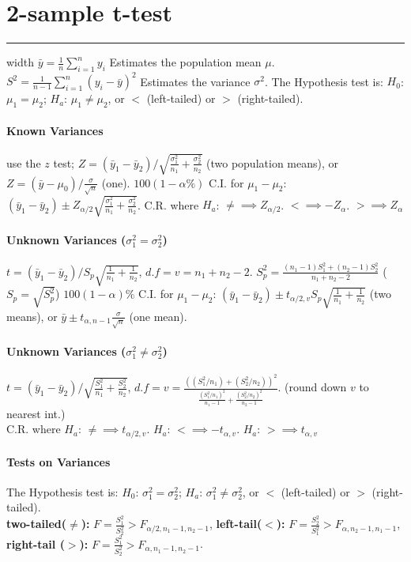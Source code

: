 \documentclass[10pt]{article}
\begin{document}
\section*{2-sample t-test}
\hrule width \textwidth
\vspace{6pt}
$\bar{y} = \frac{1}{n} \sum_{i=1}^{n} y_i$ Estimates the population mean $\mu$. $S^2 = \frac{1}{n-1}\sum_{i=1}^{n} (y_i - \bar{y})^2$ Estimates the variance $\sigma^2$. 
The Hypothesis test is:     $H_0$: $\mu_1 = \mu_2$; $H_a$: $\mu_1 \neq \mu_2$, or $<$ (left-tailed) or $>$ (right-tailed).
\paragraph{Known Variances} use the $z$ test; $Z = (\bar{y}_1 - \bar{y}_2) / \sqrt{\frac{\sigma_1^2}{n_1} + \frac{\sigma_2^2}{n_2}}$ (two population means), or $Z = (\bar{y} - \mu_0) / \frac{\sigma}{\sqrt{n}}$ (one). 
$100(1-\alpha\%)$ C.I. for $\mu_1 - \mu_2$: $(\bar{y}_1 - \bar{y}_2) \pm Z_{\alpha/2}\sqrt{\frac{\sigma_1^2}{n_1} + \frac{\sigma_2^2}{n_2}}$. 
C.R. where $H_a$: $\neq \implies Z_{\alpha / 2}$. $< \implies -Z_{\alpha}$. $> \implies Z_{\alpha}$  
\paragraph{Unknown Variances ($\sigma_1^2 = \sigma_2^2$)} $t = (\bar{y}_1 - \bar{y}_2) / S_p \sqrt{\frac{1}{n_1} + \frac{1}{n_2}}$, $d.f = v = n_1 + n_2 - 2$. $S_p^2 = \frac{(n_1 - 1)S_1^2 + (n_2 - 1)S_2^2}{n_1 + n_2 - 2}$ ($S_p = \sqrt{S_p^2}$)
$100(1-\alpha)\%$ C.I. for $\mu_1 - \mu_2$: $(\bar{y}_1 - \bar{y}_2) \pm t_{\alpha/2, v}S_p \sqrt{\frac{1}{n_1} + \frac{1}{n_2}}$ (two means), or $\bar{y} \pm t_{\alpha,n-1}\frac{\sigma}{\sqrt{n}}$ (one mean).
\paragraph{Unknown Variances ($\sigma_1^2 \neq \sigma_2^2$)} $t = (\bar{y}_1 - \bar{y}_2) / \sqrt{\frac{S_1^2}{n_1} + \frac{S_2^2}{n_2}}$, $d.f = v = \frac{((S_1^2/n_1) + (S_2^2/n_2))^2}{\frac{(S_1^2/n_1)^2}{n_1 - 1} + \frac{(S_2^2/n_2)^2}{n_2 - 1}}$. (round down $v$ to nearest int.) \\
C.R. where $H_a$: $\neq \implies t_{\alpha / 2, v}$. $H_a$: $< \implies -t_{\alpha, v}$. $H_a$: $> \implies t_{\alpha, v}$ 
\paragraph{Tests on Variances}
The Hypothesis test is:     $H_0$: $\sigma_1^2 = \sigma_2^2$; $H_a$: $\sigma_1^2 \neq \sigma_2^2$, or $<$ (left-tailed) or $>$ (right-tailed).\\
\textbf{two-tailed($\neq$):} $F = \frac{S_1^2}{S_2^2} > F_{\alpha/2, n_1 - 1, n_2 - 1}$, 
\textbf{left-tail($<$):} $F = \frac{S_2^2}{S_1^2} > F_{\alpha, n_2 - 1, n_1 - 1}$, 
\textbf{right-tail ($>$):} $F = \frac{S_1^2}{S_2^2} > F_{\alpha, n_1 - 1, n_2 - 1}$.
\end{document}

